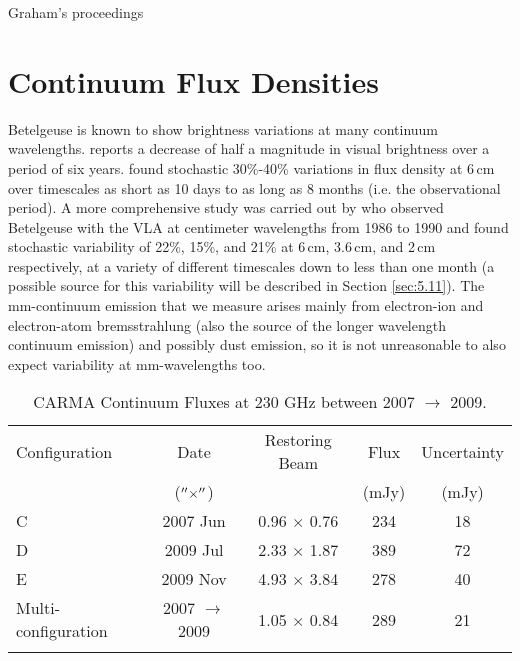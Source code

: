 Graham's proceedings
\section{Continuum Flux Densities}\label{sec:5.9}
Betelgeuse is known to show brightness variations at many continuum wavelengths. \cite{goldberg_1984} reports a decrease of half a magnitude in visual brightness over a period of six years. \cite{bookbinder_1987} found stochastic 30\%-40\% variations in flux density at 6\,cm over timescales as short as 10 days to as long as 8 months (i.e. the observational period). A more comprehensive study was carried out by \cite{drake_1992} who observed Betelgeuse with the VLA at centimeter wavelengths from 1986 to 1990 and found stochastic variability of 22\%, 15\%, and 21\% at 6\,cm, 3.6\,cm, and 2\,cm respectively, at a variety of different timescales down to less than one month (a possible source for this variability will be described in Section \ref{sec:5.11}). The mm-continuum emission that we measure arises mainly from electron-ion and electron-atom bremsstrahlung (also the source of the longer wavelength continuum emission) and possibly dust emission, so it is not unreasonable to also expect variability at mm-wavelengths too. 

\begin{table}[!hbt]
\begin{center}
\caption[CARMA Continuum Fluxes at 230 GHz]
{CARMA Continuum Fluxes at 230 GHz between 2007 $\rightarrow$ 2009.}
\begin{tabular}{lcccc}
\hline
\hline
\rule{0pt}{2.5ex}Configuration & Date &Restoring Beam & Flux & Uncertainty \\
 & ($^{\prime\prime} \times ^{\prime\prime}$) & &(mJy) & (mJy) \\
\hline
\rule{0pt}{2.5ex}C & 2007 Jun&0.96 $\times$ 0.76 & 234 & 18\\
D & 2009 Jul&2.33 $\times$ 1.87 & 389 & 72\\
E & 2009 Nov&4.93 $\times$ 3.84 & 278 & 40 \\
Multi-configuration &2007 $\rightarrow$ 2009 &1.05 $\times$ 0.84 & 289 & 21\\
\hline
\rule{0pt}{2.0ex}
\end{tabular}
\label{tab:5.1}
\end{center}
\end{table}


